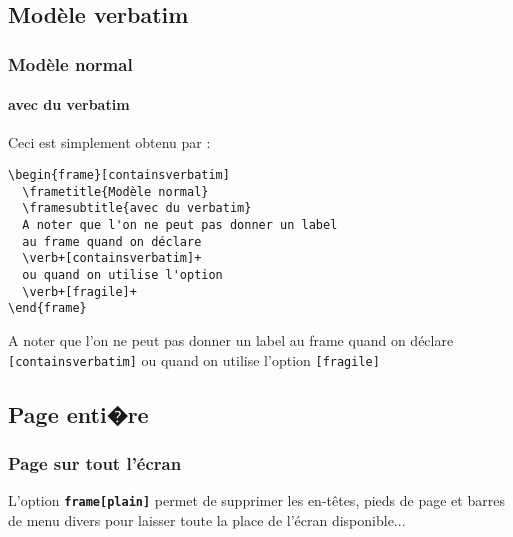 \documentclass[slidetop,11pt]{beamer}
\begin{document}
\subsection[Verbatim]{Modèle verbatim}
\begin{frame}[containsverbatim]
  \frametitle{Modèle normal}
  \framesubtitle{avec du verbatim}
  Ceci est simplement obtenu par :
  \begin{verbatim}
\begin{frame}[containsverbatim]
  \frametitle{Modèle normal}
  \framesubtitle{avec du verbatim}
  A noter que l'on ne peut pas donner un label 
  au frame quand on déclare  
  \verb+[containsverbatim]+  
  ou quand on utilise l'option
  \verb+[fragile]+
\end{frame}
  \end{verbatim}
  \vfill
 \begin{beamerboxesrounded}[scheme=clair]{}
  A noter que l'on ne peut pas donner un label au frame quand 
  on déclare  \verb+[containsverbatim]+  ou quand on utilise l'option   \verb+[fragile]+
 \end{beamerboxesrounded} 
\end{frame} 
\subsection[plein]{Page enti�re}
\begin{frame}[plain]

  \frametitle{Page sur tout l'écran}
  
  L'option \texttt{\textbf{frame[plain]}}
  permet de supprimer les en-têtes,
  pieds de page et barres de menu 
  divers pour laisser toute la 
  place de l'écran disponible...
\end{frame}  
\end{document}

